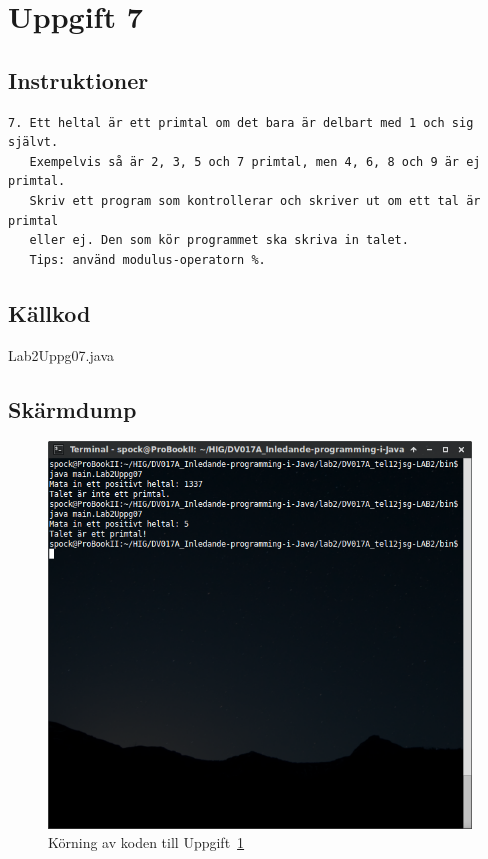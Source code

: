 \section{Uppgift 7}\label{sec:uppg07}

\subsection{Instruktioner}
\begin{verbatim}
7. Ett heltal är ett primtal om det bara är delbart med 1 och sig självt.
   Exempelvis så är 2, 3, 5 och 7 primtal, men 4, 6, 8 och 9 är ej primtal.
   Skriv ett program som kontrollerar och skriver ut om ett tal är primtal
   eller ej. Den som kör programmet ska skriva in talet.
   Tips: använd modulus-operatorn %.
\end{verbatim}


\subsection{Källkod}
\caption{Lab2Uppg07.java}
\label{src:uppg07}


\subsection{Skärmdump}
\begin{figure}[htbp]
    \centering
        \includegraphics[width=\linewidth]{img/07.png}
    \caption{Körning av koden till Uppgift~\ref{sec:uppg07}}
    \label{fig:uppg07-screenshot}
\end{figure}

